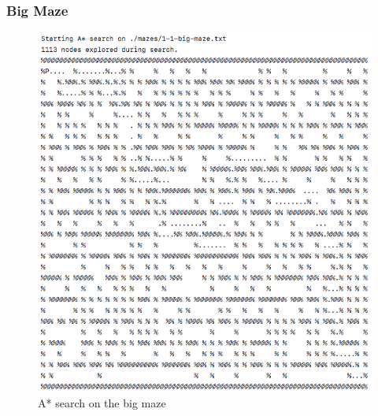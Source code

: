\documentclass[titlepage]{article}
\begin{document}
\subsubsection{Big Maze}
\begin{figure}[h!]
\includegraphics[width=\linewidth]{astarbig.png}
\caption{A* search on the big maze}
\label{fig:ASTARbig}
\end{figure}

\newpage
\end{document}

